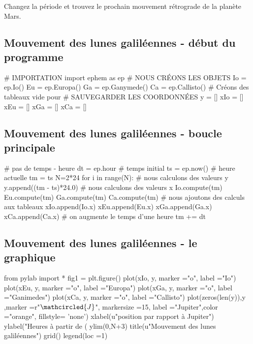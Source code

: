 \documentclass[%
oneside,                 %
final,                   %
10pt]{article}
\newenvironment{doconceexercise}{}{}
\newcounter{doconceexercisecounter}
\begin{document}


\begin{doconceexercise}



Changez la période et trouvez le prochain mouvement rétrograde de la planète Mars.

\end{doconceexercise}


\subsection{Mouvement des lunes galiléennes - début du programme}
\bpycod
# IMPORTATION
import ephem as ep
# NOUS CRÉONS LES OBJETS
Io = ep.Io()
Eu = ep.Europa()
Ga = ep.Ganymede()
Ca = ep.Callisto()
# Créons des tableaux vide pour
# SAUVEGARDER LES COORDONNÉES
y = []
xIo = []
xEu = []
xGa = []
xCa = []
\epycod

\subsection{Mouvement des lunes galiléennes - boucle principale}
\bpycod
# pas de temps - heure
dt = ep.hour
# temps initial
ts = ep.now()
# heure actuelle
tm = ts
N=2*24
for i in range(N):
    # nous calculons des valeurs y
    y.append((tm - ts)*24.0)
    # nous calculons des valeurs x
    Io.compute(tm)
    Eu.compute(tm)
    Ga.compute(tm)
    Ca.compute(tm)
    # nous ajoutons des calculs aux tableaux
    xIo.append(Io.x)
    xEu.append(Eu.x)
    xGa.append(Ga.x)
    xCa.append(Ca.x)
    # on augmente le temps d'une heure
    tm += dt
\epycod


\subsection{Mouvement des lunes galiléennes - le graphique}
\bpycod
from pylab import *
fig1 = plt.figure()
plot(xIo, y, marker ="o", label ="Io")
plot(xEu, y, marker ="o", label ="Europa")
plot(xGa, y, marker ="o", label ="Ganimedes")
plot(xCa, y, marker ="o", label ="Callisto")
plot(zeros(len(y)),y ,marker =r"$\mathcircled{J}$", markersize =15,
     label ="Jupiter",color ="orange", fillstyle= 'none')
xlabel(u"position par rapport à Jupiter")
ylabel("Heures à partir de (%
ylim(0,N+3)
title(u"Mouvement des lunes galiléennes")
grid()
legend(loc =1)
\end{document}
